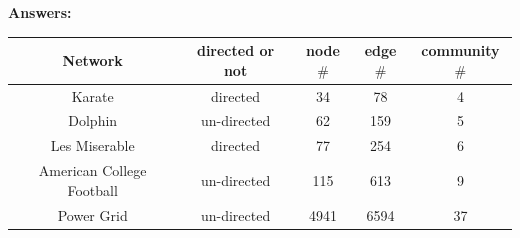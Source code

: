 \documentclass{amsart}
\theoremstyle{definition}
\theoremstyle{remark}
\numberwithin{equation}{section}
\begin{document}
\begin{enumerate}
\vspace{0.2cm}

\textbf{Answers:}

\begin{center}
\begin{tabular}{|c|c|c|c|c|}\hline
Network                   & directed or not  & node$ \#$ & edge$ \#$ & community$ \# $ \\ \hline
Karate                    & directed         &    34     &    78     &        4        \\ \hline
Dolphin                   & un-directed      &    62     &    159    &        5        \\ \hline
Les Miserable             & directed         &    77     &    254    &        6        \\ \hline
American College Football & un-directed      &    115    &    613    &        9        \\ \hline
Power Grid                & un-directed      &    4941   &    6594   &        37       \\ \hline
\end{tabular}
\end{center}







\end{enumerate}
\end{document}
